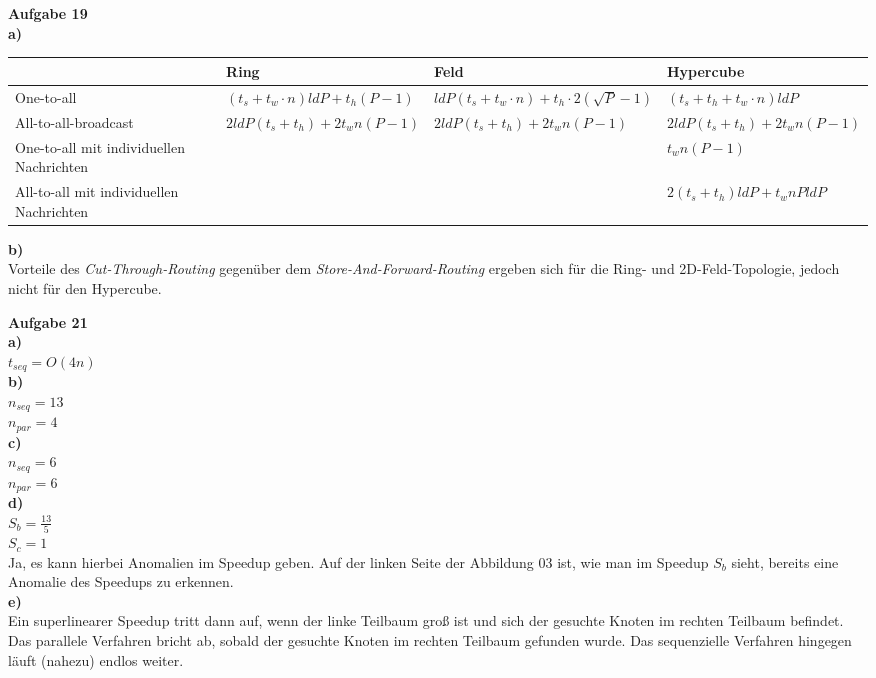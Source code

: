 \documentclass{article}
\begin{document}
\pagestyle{myheadings}
{\bf Aufgabe 19}\\
{\bf a)}\\
\begin{tabularx}{\textwidth}{|X|X|X|X|}
\hline
 & Ring & Feld & Hypercube \\
\hline
One-to-all & $(t_s + t_w \cdot n) ld P + t_h(P-1)$ & $ld P(t_s + t_w \cdot n) + t_h \cdot 2(\sqrt{P}-1)$ & $(t_s+t_h+t_w \cdot n) ld P$ \\
\hline
All-to-all-broadcast & $2 ld P(t_s+t_h)+2t_wn(P-1)$ & $2 ld P(t_s+t_h)+2t_wn(P-1)$ & $2 ld P(t_s+t_h)+2t_wn(P-1)$ \\
\hline
One-to-all mit individuellen Nachrichten & & & $t_wn(P-1)$ \\
\hline
All-to-all mit individuellen Nachrichten & & & $2(t_s+t_h) ld P+t_wnP ld P$ \\
\hline
\end{tabularx}
{\bf b)}\\
Vorteile des \textit{Cut-Through-Routing} gegenüber dem \textit{Store-And-Forward-Routing} ergeben sich für die Ring- und 2D-Feld-Topologie, jedoch nicht für den Hypercube.

{\bf Aufgabe 21}\\
{\bf a)}\\
$t_{seq}=O(4n)$\\
{\bf b)}\\
$n_{seq}=13$\\
$n_{par}=4$\\
{\bf c)}\\
$n_{seq}=6$\\
$n_{par}=6$\\
{\bf d)}\\
$S_b = \frac{13}{5}$\\
$S_c = 1$\\
Ja, es kann hierbei Anomalien im Speedup geben. Auf der linken Seite der Abbildung 03 ist, wie man im Speedup $S_b$ sieht, bereits eine Anomalie des Speedups zu erkennen.\\
{\bf e)}\\
Ein superlinearer Speedup tritt dann auf, wenn der linke Teilbaum groß ist und sich der gesuchte Knoten im rechten Teilbaum befindet. Das parallele Verfahren bricht ab, sobald der gesuchte Knoten im rechten Teilbaum gefunden 
wurde. Das sequenzielle Verfahren hingegen läuft (nahezu) endlos weiter.
\end{document}

